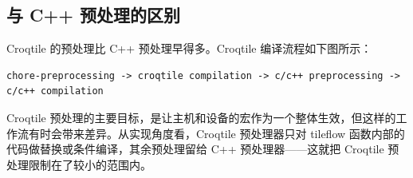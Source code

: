 \subsection*{与 C++ 预处理的区别}

Croqtile 的预处理比 C++ 预处理早得多。Croqtile 编译流程如下图所示：

\begin{lstlisting}[language=croqtile,caption={与 C 预处理的区别}]
chore-preprocessing -> croqtile compilation -> c/c++ preprocessing -> c/c++ compilation
\end{lstlisting}

Croqtile 预处理的主要目标，是让主机和设备的宏作为一个整体生效，但这样的工作流有时会带来差异。从实现角度看，Croqtile 预处理器只对 tileflow 函数内部的代码做替换或条件编译，其余预处理留给 C++ 预处理器——这就把 Croqtile 预处理限制在了较小的范围内。
